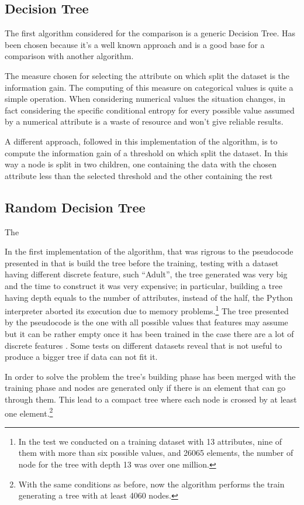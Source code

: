 \documentclass{acm_proc_article-sp-sigmod07}
\begin{document}
\subsection{Decision Tree}
The first algorithm considered for the comparison is a generic Decision
Tree. Has been chosen because it's a well known approach and is a good
base for a comparison with another algorithm.

The measure chosen for selecting the attribute on which split the dataset
is the information gain.
The computing of this measure on categorical values is quite a simple
operation. When considering numerical values the situation changes, in
fact considering the specific conditional entropy for every possible value
assumed by a numerical attribute is a waste of resource and won't give
reliable results.

A different approach, followed in this implementation of the algorithm, is
to compute the information gain of a threshold on which split the dataset.
In this way a node is split in two children, one containing the data with
the chosen attribute less than the selected threshold and the other
containing the rest 

\subsection{Random Decision Tree}
The 

In the first implementation of the algorithm, that was rigrous to the
pseudocode presented in \cite{fan:rdt} that is build the tree before the
training, testing with a dataset having different discrete feature, such
``Adult'', the tree generated was very big and the time to construct it was
very expensive; in particular, building a tree having depth equals to the
number of attributes, instead of the half, the Python interpreter
aborted its execution due to memory problems.\footnote{In the test we
conducted on a training dataset with 13 attributes, nine of them with
more than six possible values, and 26065 elements, the number of node for
the tree with depth 13 was over one million.}
The tree presented by the pseudocode is the one with all possible values
that features may assume but it can be rather empty once it has been
trained in the case there are a lot of discrete features . Some tests
on different datasets reveal that is not useful to produce a bigger tree if
data can not fit it.

In order to solve the problem the tree's building phase has been merged
with the training phase and nodes are generated only if there is an element
that can go through them. This lead to a compact tree where
each node is crossed by at least one element.\footnote{With the same
conditions as before, now the algorithm performs the train generating a
tree with at least 4060 nodes.}
\end{document}
